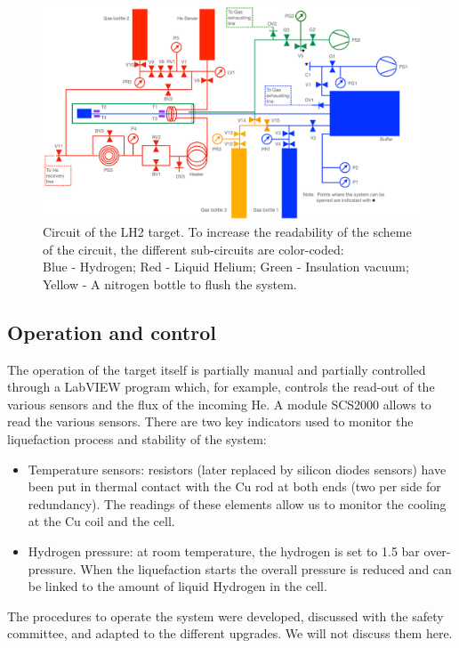 \begin{refsection}
    \begin{figure}
        \centering
        \includegraphics[width=\textwidth]{Figures/LH2/2021/2021_LH2_circuit.png}
        \caption[CEX: LH2 circuit (2021)]{Circuit of the LH2 target. To increase the readability of the scheme of the circuit, the different sub-circuits are color-coded:\\ Blue - Hydrogen; Red - Liquid Helium; Green - Insulation vacuum; Yellow - A nitrogen bottle to flush the system.}
    \label{fig:LH2:2021:circuit}
    \end{figure}

    \subsection{Operation and control}
        The operation of the target itself is partially manual and partially controlled through a LabVIEW program which, for example, controls the read-out of the various sensors and the flux of the incoming He. 
        A module SCS2000 allows to read the various sensors. 
        There are two key indicators used to monitor the liquefaction process and stability of the system:
    
        \begin{itemize}
            \item Temperature sensors: resistors (later replaced by \lakeshore silicon diodes sensors) have been put in thermal contact with the Cu rod at both ends (two per side for redundancy). 
            The readings of these elements allow us to monitor the cooling at the Cu coil and the cell.
            \item Hydrogen pressure: at room temperature, the hydrogen is set to 1.5 bar over-pressure. When the liquefaction starts the overall pressure is reduced and can be linked to the amount of liquid Hydrogen in the cell. 
        \end{itemize}
        \noindent
        The procedures to operate the system were developed, discussed with the safety committee, and adapted to the different upgrades.
        We will not discuss them here.


\end{refsection}

